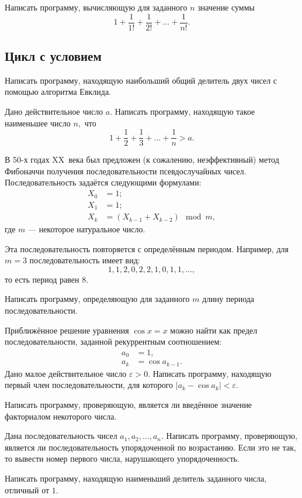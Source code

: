 \task Написать программу, вычисляющую для заданного $n$ значение суммы
\[
1+\frac1{1!} + \frac{1}{2!} + \ldots + \frac1{n!}.
\]

\subsection{Цикл с условием}

\task Написать программу, находящую наибольший общий делитель двух
чисел с помощью алгоритма Евклида.

\task Дано действительное число $a.$ Написать программу, находящую
такое наименьшее число $n,$ что
\[
1 + \frac12 + \frac13 + \ldots + \frac1n > a.
\]

\task В 50-х годах XX~века был предложен (к сожалению, неэффективный)
метод Фибоначчи получения последовательности псевдослучайных
чисел. Последовательность задаётся следующими формулами:
\begin{align*}
X_0 &= 1;\\
X_1 &= 1;\\
X_k &= (X_{k-1} + X_{k-2}) \mod m,
\end{align*}
где $m$ — некоторое натуральное число.

Эта последовательность повторяется с определённым периодом. Например,
для $m=3$ последовательность имеет вид:
\[1, 1, 2, 0, 2, 2, 1, 0, 1, 1, \ldots,\]
то есть период равен 8.

Написать программу, определяющую для заданного $m$ длину периода
последовательности.

\task Приближённое решение уравнения $\cos x = x$ можно найти как
предел последовательности, заданной рекуррентным соотношением:
\begin{align*}
  a_0 &= 1,\\
  a_k &= \cos a_{k-1}.
\end{align*}
Дано малое действительное число $\varepsilon > 0$. Написать программу,
находящую первый член последовательности, для которого $|a_k - \cos
a_k| < \varepsilon.$

\task Написать программу, проверяющую, является ли введённое значение
факториалом некоторого числа.

\task Дана последовательность чисел $a_1, a_2, \ldots, a_n.$ Написать
программу, проверяющую, является ли последовательность упорядоченной
по возрастанию. Если это не так, то вывести номер первого числа,
нарушающего упорядоченность.

\task Написать программу, находящую наименьший делитель заданного
числа, отличный от $1.$

